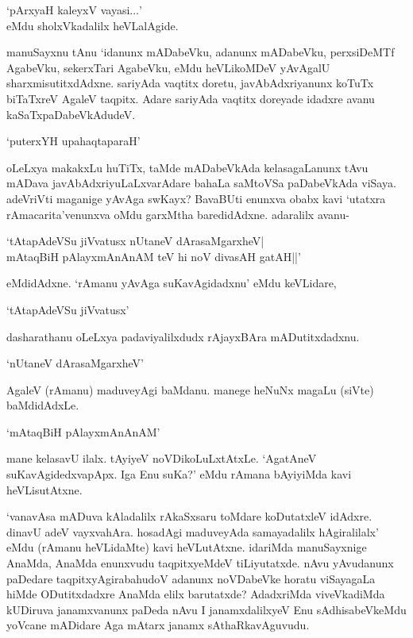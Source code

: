 \begin{shloka}
`pArxyaH kaleyxV vayasi$\ldots$'\\
eMdu sholxVkadalilx heVLalAgide.
\end{shloka}

manuSayxnu tAnu `idanunx mADabeVku, adanunx mADabeVku, perxsiDeMTf AgabeVku, sekerxTari AgabeVku, eMdu heVLikoMDeV yAvAgalU sharxmisutitxdAdxne. sariyAda vaqtitx doretu, javAbAdxriyanunx koTuTx biTaTxreV AgaleV taqpitx. Adare sariyAda vaqtitx doreyade idadxre avanu kaSaTxpaDabeVkAdudeV.

\begin{shloka}
`puterxYH upahaqtaparaH'
\end{shloka}

oLeLxya makakxLu huTiTx, taMde mADabeVkAda kelasagaLanunx tAvu mADava javAbAdxriyuLaLxvarAdare bahaLa saMtoVSa paDabeVkAda viSaya. adeVriVti maganige yAvAga swKayx? BavaBUti enunxva obabx kavi `utatxra rAmacarita'venunxva oMdu garxMtha baredidAdxne. adaralilx avanu-

\begin{shloka}
`tAtapAdeVSu jiVvatusx nUtaneV dArasaMgarxheV|\\
mAtaqBiH pAlayxmAnAnAM teV hi noV divasAH gatAH||'
\end{shloka} 

eMdidAdxne. `rAmanu yAvAga suKavAgidadxnu' eMdu keVLidare,

\begin{shloka}
`tAtapAdeVSu jiVvatusx'
\end{shloka}

dasharathanu oLeLxya padaviyalilxdudx rAjayxBAra mADutitxdadxnu.

\begin{shloka}
`nUtaneV dArasaMgarxheV'
\end{shloka}

AgaleV (rAmanu) maduveyAgi baMdanu. manege heNuNx magaLu (siVte) baMdidAdxLe.

\begin{shloka}
`mAtaqBiH pAlayxmAnAnAM'
\end{shloka}

mane kelasavU ilalx. tAyiyeV noVDikoLuLxtAtxLe. `AgatAneV suKavAgidedxvapApx. Iga Enu suKa?' eMdu rAmana bAyiyiMda kavi heVLisutAtxne.

`vanavAsa mADuva kAladalilx rAkaSxsaru toMdare koDutatxleV idAdxre. dinavU adeV vayxvahAra. hosadAgi maduveyAda samayadalilx hAgiralilalx' eMdu (rAmanu heVLidaMte) kavi heVLutAtxne. idariMda manuSayxnige AnaMda, AnaMda enunxvudu taqpitxyeMdeV tiLiyutatxde. nAvu yAvudanunx paDedare taqpitxyAgirabahudoV adanunx noVDabeVke horatu viSayagaLa hiMde ODutitxdadxre AnaMda elilx barutatxde? AdadxriMda viveVkadiMda kUDiruva janamxvanunx paDeda nAvu I janamxdalilxyeV Enu sAdhisabeVkeMdu yoVcane mADidare Aga mAtarx janamx sAthaRkavAguvudu.


\endchapter
